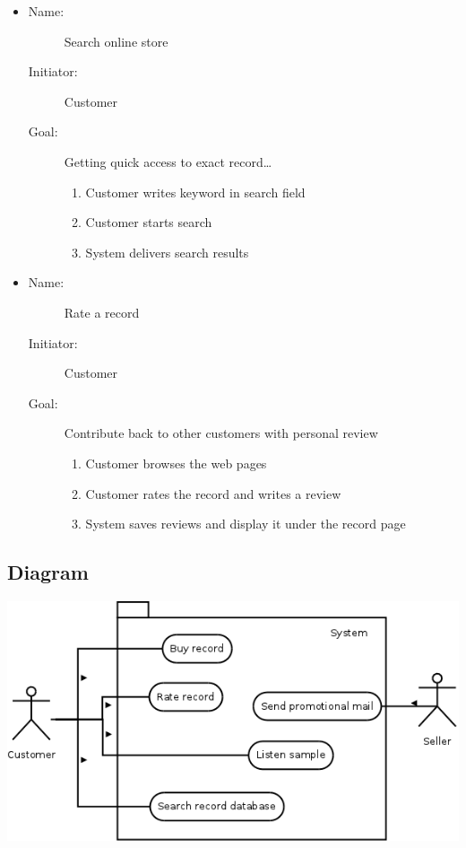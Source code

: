 \documentclass[12pt, titlepage, a4paper]{article}
\begin{document}
\begin{description}
\begin{itemize}
    \item 
        \begin{description}
            \item[Name:]Search online store
		    \item[Initiator:]Customer
		    \item[Goal:]Getting quick access to exact record\dots
		    \begin{enumerate}
		    	\item Customer writes keyword in search field
			\item Customer starts search
			\item System delivers search results
		    \end{enumerate}
        \end{description}
    \item 
        \begin{description}
		\item[Name:]Rate a record 
		\item[Initiator:]Customer 
		\item[Goal:]Contribute back to other customers with personal review 
			\begin{enumerate}
			\item Customer browses the web pages
			\item Customer rates the record and writes a review
			\item System saves reviews and display it under the record page
			\end{enumerate}
        \end{description}
    \end{itemize}
\end{description}

\subsection{Diagram}
    \begin{center}
        \includegraphics[scale=0.47]{lab2.png}
    \end{center}
\end{document}
